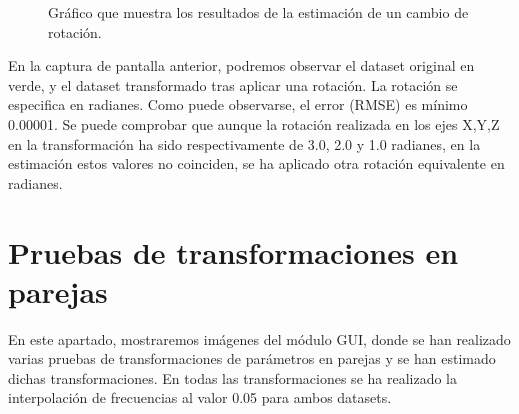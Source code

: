 \begin{figure}
\begin{center}
\hspace{0.5cm}

\end{center}

\caption{Gráfico que muestra los resultados de la estimación de un cambio de rotación.}
\end{figure}

En la captura de pantalla anterior, podremos observar el dataset original en verde, y el dataset transformado tras aplicar una rotación. La rotación se especifica en radianes. Como puede observarse, el error (RMSE) es mínimo 0.00001. Se puede comprobar que aunque la rotación realizada en los ejes X,Y,Z en la transformación ha sido respectivamente de 3.0, 2.0 y 1.0 radianes, en la estimación estos valores no coinciden, se ha aplicado otra rotación equivalente en radianes.



\section{Pruebas de transformaciones en parejas}
En este apartado, mostraremos imágenes del módulo GUI, donde se han realizado varias pruebas de transformaciones de parámetros en parejas y se han estimado dichas transformaciones.
En todas las transformaciones se ha realizado la interpolación de frecuencias al valor 0.05 para ambos datasets.


